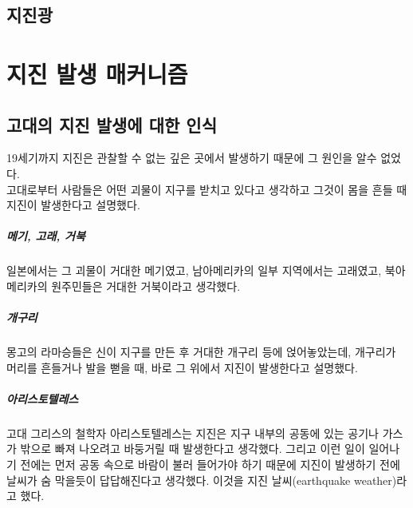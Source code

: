 \documentclass[12pt, a4paper, oneside]{book}
\begin{document}
	\section{지진광}
	
	
	
	\clearpage
	\chapter{지진 발생 매커니즘}
	


	\clearpage
	\section{고대의 지진 발생에 대한 인식}

		19세기까지 지진은 관찰할 수 없는 깊은 곳에서 발생하기 때문에 그 원인을 알수 없었다.\\
		
		고대로부터 사람들은 어떤 괴물이 지구를 받치고 있다고 생각하고 그것이 몸을 흔들 때 지진이 발생한다고 설명했다.
		\paragraph{메기, 고래, 거북}
		일본에서는 그 괴물이 거대한 메기였고, 남아메리카의 일부 지역에서는 고래였고, 북아메리카의 원주민들은 거대한 거북이라고 생각했다.
		
		\paragraph{개구리}
		몽고의 라마승들은 신이 지구를 만든 후 거대한 개구리 등에 얹어놓았는데, 개구리가 머리를 흔들거나 발을 뻗을 때, 바로 그 위에서 지진이 발생한다고 설명했다.
		
		\paragraph{아리스토텔레스}
		고대 그리스의 철학자 아리스토텔레스는 지진은 지구 내부의 공동에 있는 공기나 가스가 밖으로 빠져 나오려고 바둥거릴 때 발생한다고 생각했다.
		그리고 이런 일이 일어나기 전에는 먼저 공동 속으로 바람이 불러 들어가야 하기 때문에 지진이 발생하기 전에 날씨가 숨 막을듯이 답답해진다고 생각했다.
		이것을 지진 날씨(earthquake weather)라고 했다.
\end{document}
